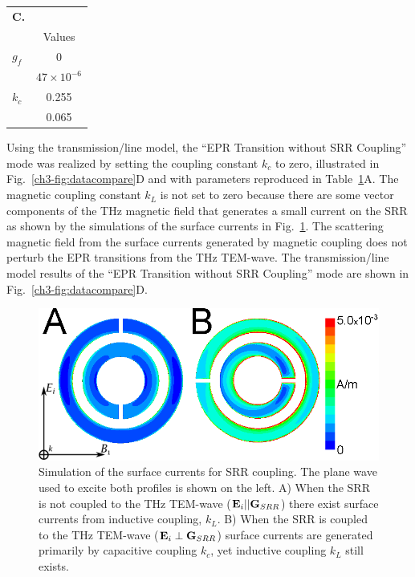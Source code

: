 \begin{table}[htp]
\begin{tabular}{ll}
\multicolumn{1}{r}{\textbf{{\Large C.}}}&{} \\
\multicolumn{1}{l|}{} & \multicolumn{1}{c}{Values} \\ \hline\hline
\multicolumn{1}{l|}{$g_f$} & \multicolumn{1}{c}{0} \\
\rowcolor[rgb]{0.937,0.937,0.937}  
\multicolumn{1}{l|}{$g_r$} & \multicolumn{1}{c}{$47\times 10^{-6}$} \\
\multicolumn{1}{l|}{$k_c$} & \multicolumn{1}{c}{0.255} \\
\rowcolor[rgb]{0.937,0.937,0.937}  
\multicolumn{1}{l|}{$k_L$} & \multicolumn{1}{c}{0.065} 
\end{tabular}\label{ch3-table:parameters}
\end{table}

Using the transmission\-/line model, the ``EPR Transition without SRR Coupling'' mode was realized by setting the coupling constant $k_c$ to zero, illustrated in Fig.~\ref{ch3-fig:datacompare}D and with parameters reproduced in Table~\ref{ch3-table:parameters}A. The magnetic coupling constant $k_L$ is not set to zero because there are some vector components of the THz magnetic field that generates a small current on the SRR as shown by the simulations of the surface currents in Fig.~\ref{ch3-fig:surfacecurrent}. The scattering magnetic field from the surface currents generated by magnetic coupling does not perturb the EPR transitions from the THz TEM-wave. The transmission\-/line model results of the ``EPR Transition without SRR Coupling'' mode are shown in Fig.~\ref{ch3-fig:datacompare}D.

\begin{figure}[htbp]\centering
  \includegraphics{Kapitel/Ch3-Images/SurfaceCurrent-THz.eps}%
  \caption[Simulation of the surface currents for SRR coupling.]{Simulation of the surface currents for SRR coupling. The plane wave used to excite both profiles is shown on the left. A) When the SRR is not coupled to the THz TEM-wave ($\textbf{E}_{i}||\textbf{G}_{SRR}$) there exist surface currents from inductive coupling, $k_L$. B) When the SRR is coupled to the THz TEM-wave ($\textbf{E}_{i}\perp\textbf{G}_{SRR}$) surface currents are generated primarily by capacitive coupling $k_c$, yet inductive coupling $k_L$ still exists.} \label{ch3-fig:surfacecurrent}
\end{figure}


